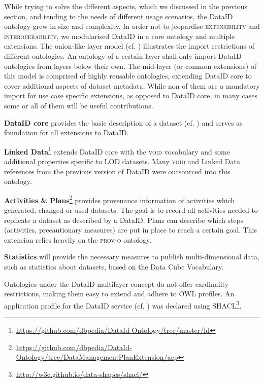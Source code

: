 \documentclass[runningheads,a4paper]{llncs}
\newcommand{\extensibility}{{\scshape extensibility}\xspace}
\newcommand{\interoperability}{{\scshape interoperability}\xspace}
\newcommand{\prov}{{\scshape prov-o}\xspace}
\newcommand{\void}{{\scshape void}\xspace}
\newcommand\footnoteurl[1]{\footnote{\scriptsize\url{#1}}}
\begin{document}
While trying to solve the different aspects, which we discussed in the previous section, and tending to the needs of different usage scenarios, the DataID ontology grew in size and complexity.
In order not to jeopardise \extensibility and \interoperability, we modularised DataID in a core ontology and multiple extensions. The onion-like layer model (cf. ) illustrates the import restrictions of different ontologies. An ontology of a certain layer shall only import DataID ontologies from layers below their own.
The mid-layer (or common extensions) of this model is comprised of highly reusable ontologies, extending DataID core to cover additional aspects of dataset metadata. While non of them are a mandatory import for use case specific extensions, as opposed to DataID core, in many cases some or all of them will be useful contributions.%

\textbf{DataID core} provides the basic description of a dataset (cf. ) and serves as foundation for all extensions to DataID.

\textbf{Linked Data}\footnoteurl{https://github.com/dbpedia/DataId-Ontology/tree/master/ld} extends DataID core with the \void vocabulary\cite{void} and some additional properties specific to LOD datasets. Many \void and Linked Data references from the previous version of DataID were outsourced into this ontology.

\textbf{Activities \& Plans}\footnoteurl{https://github.com/dbpedia/DataId-Ontology/tree/DataManagementPlanExtension/acp} provides provenance information of activities which generated, changed or used datasets. The goal is to record all activities needed to replicate a dataset as described by a DataID. Plans can describe which steps (activities, precautionary measures) are put in place to reach a certain goal. This extension relies heavily on the \prov ontology\cite{prov}.

\textbf{Statistics} will provide the necessary measures to publish multi-dimensional data, such as statistics about datasets, based on the Data Cube Vocabulary\cite{datacube}.

Ontologies under the DataID multilayer concept do not offer cardinality restrictions, making them easy to extend and adhere to OWL profiles. An application profile for the DataID service (cf. ) was declared using SHACL\footnoteurl{http://w3c.github.io/data-shapes/shacl/}.%
\end{document}
